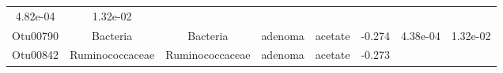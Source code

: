\documentclass[11pt,]{article}
\begin{document}
\begin{longtable}[]{@{}cccccccc@{}}
\begin{minipage}[t]{0.08\columnwidth}
4.82e-04\strut
\end{minipage} & \begin{minipage}[t]{0.08\columnwidth}\centering\strut
1.32e-02\strut
\end{minipage}\tabularnewline
\begin{minipage}[t]{0.08\columnwidth}\centering\strut
Otu00790\strut
\end{minipage} & \begin{minipage}[t]{0.15\columnwidth}\centering\strut
Bacteria\strut
\end{minipage} & \begin{minipage}[t]{0.15\columnwidth}\centering\strut
Bacteria\strut
\end{minipage} & \begin{minipage}[t]{0.08\columnwidth}\centering\strut
adenoma\strut
\end{minipage} & \begin{minipage}[t]{0.09\columnwidth}\centering\strut
acetate\strut
\end{minipage} & \begin{minipage}[t]{0.07\columnwidth}\centering\strut
-0.274\strut
\end{minipage} & \begin{minipage}[t]{0.08\columnwidth}\centering\strut
4.38e-04\strut
\end{minipage} & \begin{minipage}[t]{0.08\columnwidth}\centering\strut
1.32e-02\strut
\end{minipage}\tabularnewline
\begin{minipage}[t]{0.08\columnwidth}\centering\strut
Otu00842\strut
\end{minipage} & \begin{minipage}[t]{0.15\columnwidth}\centering\strut
Ruminococcaceae\strut
\end{minipage} & \begin{minipage}[t]{0.15\columnwidth}\centering\strut
Ruminococcaceae\strut
\end{minipage} & \begin{minipage}[t]{0.08\columnwidth}\centering\strut
adenoma\strut
\end{minipage} & \begin{minipage}[t]{0.09\columnwidth}\centering\strut
acetate\strut
\end{minipage} & \begin{minipage}[t]{0.07\columnwidth}\centering\strut
-0.273\strut
\end{minipage} & \begin{minipage}[t]{0.08\columnwidth}\centering\strut

\end{minipage}
\end{longtable}
\end{document}
